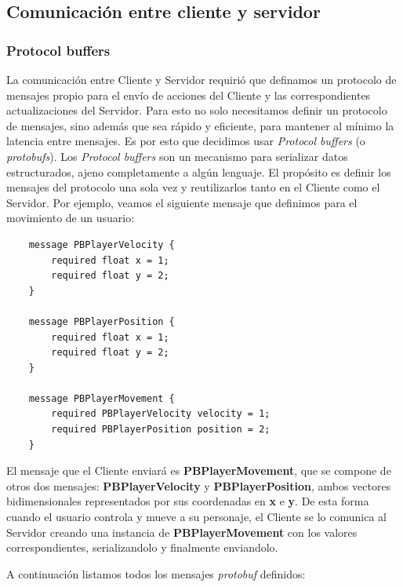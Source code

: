 \subsection{Comunicación entre cliente y servidor}

\subsubsection{Protocol buffers}

\noindent La comunicación entre Cliente y Servidor requirió que definamos un protocolo de mensajes propio para 
el envío de acciones del Cliente y las correspondientes actualizaciones del Servidor.
Para esto no solo necesitamos definir un protocolo de mensajes, sino además que sea rápido y eficiente, 
para mantener al mínimo la latencia entre mensajes.
Es por esto que decidimos usar \textit{Protocol buffers} (o \textit{protobufs}). Los 
\textit{Protocol buffers} son un mecanismo para serializar datos estructurados, ajeno completamente 
a algún lenguaje. El propósito es definir los mensajes del protocolo una sola vez y reutilizarlos 
tanto en el Cliente como el Servidor.
Por ejemplo, veamos el siguiente mensaje que definimos para el movimiento de un usuario:
\begin{verbatim}
    message PBPlayerVelocity {
        required float x = 1;
        required float y = 2;
    }

    message PBPlayerPosition {
        required float x = 1;
        required float y = 2;
    }

    message PBPlayerMovement {
        required PBPlayerVelocity velocity = 1;
        required PBPlayerPosition position = 2;
    }
\end{verbatim}

El mensaje que el Cliente enviará es \textbf{PBPlayerMovement}, que se compone de otros dos mensajes: 
\textbf{PBPlayerVelocity} y \textbf{PBPlayerPosition}, ambos vectores bidimensionales representados 
por sus coordenadas en \textbf{x} e \textbf{y}. De esta forma cuando el usuario controla y mueve a 
su personaje, el Cliente se lo comunica al Servidor creando una instancia de \textbf{PBPlayerMovement} 
con los valores correspondientes, serializandolo y finalmente enviandolo.

A continuación listamos todos los mensajes \textit{protobuf} definidos:

